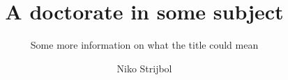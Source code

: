\documentclass[
    paper=240mm:170mm,
    paper=portrait,
    parskip=half,
    cleardoublepage=plain,
    toc=chapterentrywithdots,
    fontsize=10pt,
]{scrbook}
\author{Niko Strijbol}
\title{A doctorate in some subject}
\subtitle{Some more information on what the title could mean}
\begin{document}
\frontmatter

{
    \selectfont\panno
    \maketitle
}



\tableofcontents





\mainmatter




%


%    
%    
\end{document}

